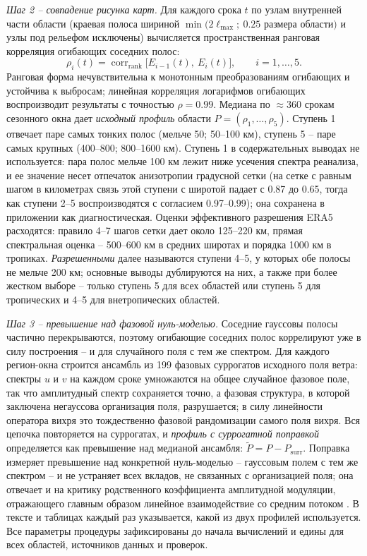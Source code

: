 \documentclass[12pt,a4paper]{article}
\newcommand{\Psurr}{P_{\mathrm{surr}}}
\begin{document}
\emph{Шаг 2 -- совпадение рисунка карт.} Для каждого срока $t$ по узлам внутренней части области (краевая полоса шириной $\min(2\ell_{\max};\ 0.25$ размера области$)$ и узлы под рельефом исключены) вычисляется пространственная ранговая корреляция огибающих соседних полос:
\begin{equation}
\label{eq:rho}
\rho_i(t) = \operatorname{corr}_{\mathrm{rank}}\bigl[E_{i-1}(t),\ E_i(t)\bigr], \qquad i = 1, \dots, 5.
\end{equation}
Ранговая форма нечувствительна к монотонным преобразованиям огибающих и устойчива к выбросам; линейная корреляция логарифмов огибающих воспроизводит результаты с точностью $\rho = 0.99$. Медиана по $\approx$360 срокам сезонного окна дает \emph{исходный профиль} области $P = (\rho_1, \dots, \rho_5)$. Ступень 1 отвечает паре самых тонких полос (мельче 50; 50--100 км), ступень 5 -- паре самых крупных (400--800; 800--1600 км). Ступень 1 в содержательных выводах не используется: пара полос мельче 100 км лежит ниже усечения спектра реанализа, и ее значение несет отпечаток анизотропии градусной сетки (на сетке с равным шагом в километрах связь этой ступени с широтой падает с 0.87 до 0.65, тогда как ступени 2--5 воспроизводятся с согласием 0.97--0.99); она сохранена в приложении как диагностическая. Оценки эффективного разрешения ERA5 расходятся: правило 4--7 шагов сетки \cite{Skamarock2004} дает около 125--220 км, прямая спектральная оценка \cite{Bolgiani2022} -- 500--600 км в средних широтах и порядка 1000 км в тропиках. \emph{Разрешенными} далее называются ступени 4--5, у которых обе полосы не мельче 200 км; основные выводы дублируются на них, а также при более жестком выборе -- только ступень 5 для всех областей или ступень 5 для тропических и 4--5 для внетропических областей.

\emph{Шаг 3 -- превышение над фазовой нуль-моделью.} Соседние гауссовы полосы частично перекрываются, поэтому огибающие соседних полос коррелируют уже в силу построения -- и для случайного поля с тем же спектром. Для каждого регион-окна строится ансамбль из 199 фазовых суррогатов исходного поля ветра: спектры $u$ и $v$ на каждом сроке умножаются на общее случайное фазовое поле, так что амплитудный спектр сохраняется точно, а фазовая структура, в которой заключена негауссова организация поля, разрушается; в силу линейности оператора вихря это тождественно фазовой рандомизации самого поля вихря. Вся цепочка повторяется на суррогатах, и \emph{профиль с суррогатной поправкой} определяется как превышение над медианой ансамбля: $\tilde P = P - \Psurr$. Поправка измеряет превышение над конкретной нуль-моделью -- гауссовым полем с тем же спектром -- и не устраняет всех вкладов, не связанных с организацией поля; она отвечает и на критику родственного коэффициента амплитудной модуляции, отражающего главным образом линейное взаимодействие со средним потоком \cite{CuiJacobi2025}. В тексте и таблицах каждый раз указывается, какой из двух профилей используется. Все параметры процедуры зафиксированы до начала вычислений и едины для всех областей, источников данных и проверок.
\end{document}
